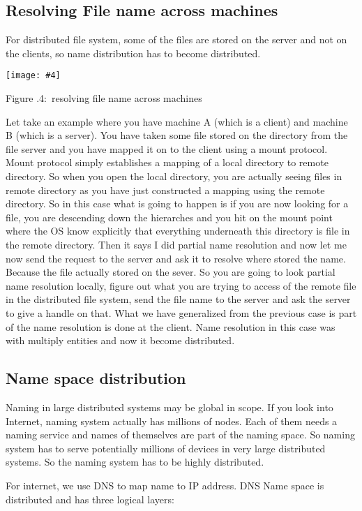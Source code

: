 \documentclass[twoside]{article}
\newcounter{lecnum}
\newcommand{\fig}[4]{
            \centerline{\texttt{[image: \#4]}}
            \begin{center}
            Figure \thelecnum.#1:~#3
            \end{center}
    }
\begin{document}
\subsection{Resolving File name across machines}
For distributed file system, some of the files are stored on the server and not on the clients, so name distribution has to become distributed. 

 \fig{4}{0.6}{resolving file name across machines}{name.png}
 
Let take an example where you have machine A (which is a client) and machine B (which is a server). You have taken some file stored on the directory from the file server and you have mapped it on to the client using a mount protocol. Mount protocol simply establishes a mapping of a local directory to remote directory. So when you open the local directory, you are actually seeing files in remote directory as you have just constructed a mapping using the remote directory. So in this case what is going to happen is if you are now looking for a file, you are descending down the hierarches and you hit on the mount point where the OS know explicitly that everything underneath this directory is file in the remote directory. Then it says I did partial name resolution and now let me now send the request to the server and ask it to resolve where stored the name. Because the file actually stored on the sever. So you are going to look partial name resolution locally, figure out what you are trying to access of the remote file in the distributed file system, send the file name to the server and ask the server to give a handle on that. What we have generalized from the previous case is part of the name resolution is done at the client. Name resolution in this case was with multiply entities and now it become distributed.

\subsection{Name space distribution}
Naming in large distributed systems may be global in scope. If you look into Internet, naming system actually has millions of nodes. Each of them needs a naming service and names of themselves are part of the naming space. So naming system has to serve potentially millions of devices in very large distributed systems. So the naming system has to be highly distributed.

For internet, we use DNS to map name to IP address. DNS Name space is distributed and has three logical layers:
\end{document}
